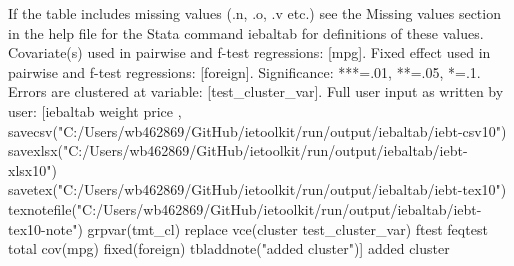 If the table includes missing values (.n, .o, .v etc.) see the Missing values section in the help file for the Stata command iebaltab for definitions of these values. Covariate(s) used in pairwise and f-test regressions: [mpg]. Fixed effect used in pairwise and f-test regressions: [foreign]. Significance: ***=.01, **=.05, *=.1. Errors are clustered at variable: [test\_cluster\_var]. Full user input as written by user: [iebaltab weight price , savecsv("C:/Users/wb462869/GitHub/ietoolkit/run/output/iebaltab/iebt-csv10") savexlsx("C:/Users/wb462869/GitHub/ietoolkit/run/output/iebaltab/iebt-xlsx10") savetex("C:/Users/wb462869/GitHub/ietoolkit/run/output/iebaltab/iebt-tex10") texnotefile("C:/Users/wb462869/GitHub/ietoolkit/run/output/iebaltab/iebt-tex10-note") grpvar(tmt\_cl) replace vce(cluster test\_cluster\_var) ftest feqtest total cov(mpg) fixed(foreign) tbladdnote("added cluster")] added cluster
